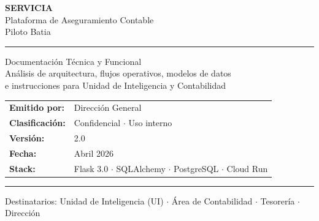 \documentclass[12pt,a4paper]{article}
\begin{document}
\begin{titlepage}
  \pagecolor{ink900}
  \color{white}
  \centering
  \vspace*{3cm}

  {\fontsize{48}{52}\selectfont\bfseries SERVICIA}\\[0.4cm]
  {\large\color{sky500!80!white} Plataforma de Aseguramiento Contable}\\[0.2cm]
  {\normalsize\color{graylight} Piloto Batia}

  \vspace{2cm}
  \noindent\color{sky500}\rule{\linewidth}{1pt}
  \vspace{0.5cm}

  {\large Documentaci\'on T\'ecnica y Funcional}\\[0.3cm]
  {\normalsize An\'alisis de arquitectura, flujos operativos, modelos de datos\\
  e instrucciones para Unidad de Inteligencia y Contabilidad}

  \vfill

  \begin{tabular}{ll}
    \textbf{Emitido por:}    & Direcci\'on General \\[4pt]
    \textbf{Clasificaci\'on:}  & Confidencial $\cdot$ Uso interno \\[4pt]
    \textbf{Versi\'on:}        & 2.0 \\[4pt]
    \textbf{Fecha:}          & Abril 2026 \\[4pt]
    \textbf{Stack:}          & Flask 3.0 $\cdot$ SQLAlchemy $\cdot$ PostgreSQL $\cdot$ Cloud Run \\
  \end{tabular}

  \vspace{1cm}
  \noindent\color{sky500!50!white}\rule{\linewidth}{0.4pt}
  \vspace{0.3cm}

  {\small\color{graylight}
    Destinatarios: Unidad de Inteligencia (UI) $\cdot$ \'Area de Contabilidad $\cdot$ Tesorer\'ia $\cdot$ Direcci\'on}
\end{titlepage}

\pagecolor{white}
\color{black}

\tableofcontents
\newpage
\end{document}
